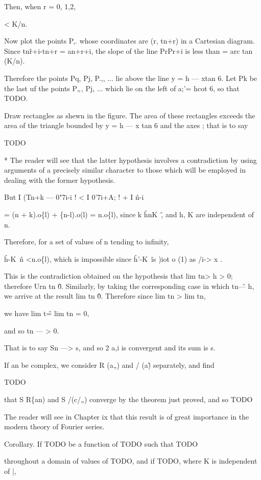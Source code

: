 Then, when r = 0, 1,2,

< K/n.

Now plot the points P,. whose coordinates are (r, tn+r) in a Cartesian
diagram. Since tn\^r+i-tn+r = an+r+i, the slope of the line PrPr+i is
less than = arc tan (K/n).

Therefore the points Pq, Pj, P.,, ... lie above the line y = h — xtan
6. Let Pk be the last uf the points P„, Pj, ... which lie on the left
of a;'= hcot 6, so that TODO.

Draw rectangles as shewn in the figure. The area of these rectangles
exceeds the area of the triangle bounded by y = h — x tan 6 and the
axes ; that is to say

TODO

* The reader will see that the latter hypothesis involves a
contradiction by using arguments of a precisely similar character to
those which will be employed in dealing with the former hypothesis.


%
%

But I (Tn+k — 0"7i-i ! < I 0'7i+A; ! + I \^n-i \

= (n + k).o\{l) + \{n-l).o(l)
= n.o\{l),
since k \^ hnK~\^, and h, K are independent of n.

Therefore, for a set of values of n tending to infinity,

\^h-K~\^n <n.o\{l),
which is impossible since \^h'-K~\^ is )iot o (1) as /i-> x .

This is the contradiction obtained on the hypothesis that lim tn> h >
0; therefore Urn tn \^ 0. Similarly, by taking the corresponding case
in which tn\^ — h, we arrive at the result lim tn \^ 0. Therefore
since lim tn > lim tn, 

we have lim t\^ = lim tn = 0,

and so tn — > 0.

That is to say Sn —> s, and so 2 a,i is convergent and its sum is s.

If an be complex, we consider R (a„) and / (a\^) separately, and find

TODO

that S R\{an) and S /(c/„) converge by the theorem just proved, and so
TODO

The reader will see in Chapter ix that this result is of great
importance in the modern theory of Fourier series.

Corollary. If TODO be a function of TODO such that TODO

throughout a domain of values of TODO, and if TODO, where K is independent of |,

